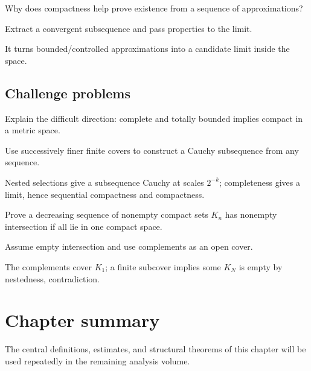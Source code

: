 \begin{exercise}\label{exr:ii06-expand-14}
Why does compactness help prove existence from a sequence of approximations?
\end{exercise}
\begin{hint}
Extract a convergent subsequence and pass properties to the limit.
\end{hint}
\begin{solution}
It turns bounded/controlled approximations into a candidate limit inside the space.
\end{solution}

\subsection*{Challenge problems}

\begin{exercise}\label{exr:ii06-expand-15}
Explain the difficult direction: complete and totally bounded implies compact in a metric space.
\end{exercise}
\begin{hint}
Use successively finer finite covers to construct a Cauchy subsequence from any sequence.
\end{hint}
\begin{solution}
Nested selections give a subsequence Cauchy at scales \(2^{-k}\); completeness gives a limit, hence sequential compactness and compactness.
\end{solution}

\begin{exercise}\label{exr:ii06-expand-16}
Prove a decreasing sequence of nonempty compact sets \(K_n\) has nonempty intersection if all lie in one compact space.
\end{exercise}
\begin{hint}
Assume empty intersection and use complements as an open cover.
\end{hint}
\begin{solution}
The complements cover \(K_1\); a finite subcover implies some \(K_N\) is empty by nestedness, contradiction.
\end{solution}
\section*{Chapter summary}
The central definitions, estimates, and structural theorems of this chapter will be used repeatedly in the remaining analysis volume.
